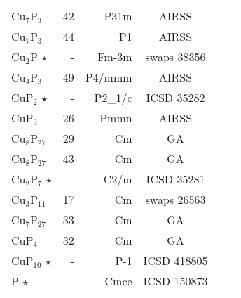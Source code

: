 \begin{tabular}{l r r c l l}
  Cu$_\text{7}$P$_\text{3}$               &          42          &         P31m         &             AIRSS              &                                \\
  Cu$_\text{7}$P$_\text{3}$               &          44          &          P1          &             AIRSS              &                                \\
        Cu$_\text{2}$P          $\star$   &          -           &       Fm-3m         &          swaps 38356           &                                \\
  Cu$_\text{4}$P$_\text{3}$               &          49          &        P4/mmm        &             AIRSS              &                                \\
        CuP$_\text{2}$          $\star$   &          -           &       P2_1/c        &           ICSD 35282           &                                \\
        CuP$_\text{3}$                    &          26          &         Pmmn         &             AIRSS              &                                \\
  Cu$_\text{8}$P$_\text{27}$              &          29          &          Cm          &               GA               &                                \\
  Cu$_\text{8}$P$_\text{27}$              &          43          &          Cm          &               GA               &                                \\
  Cu$_\text{2}$P$_\text{7}$     $\star$   &          -           &        C2/m         &           ICSD 35281           &                                \\
  Cu$_\text{3}$P$_\text{11}$              &          17          &          Cm          &          swaps 26563           &                                \\
  Cu$_\text{7}$P$_\text{27}$              &          33          &          Cm          &               GA               &                                \\
        CuP$_\text{4}$                    &          32          &          Cm          &               GA               &                                \\
       CuP$_\text{10}$          $\star$   &          -           &        P-1          &          ICSD 418805           &                                \\
              P                 $\star$   &          -           &        Cmce         &          ICSD 150873           &                                \\
\end{tabular}